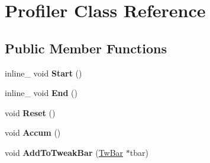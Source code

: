 \hypertarget{class_profiler}{\section{Profiler Class Reference}
\label{class_profiler}
}
\subsection*{Public Member Functions}
\begin{DoxyCompactItemize}
\item 
\hypertarget{class_profiler_a81f783a709b4047f2286f90353089a0e}{inline\+\_\+ void {\bfseries Start} ()}\label{class_profiler_a81f783a709b4047f2286f90353089a0e}

\item 
\hypertarget{class_profiler_a1f6cfd5cc21957b94df590169c118d4b}{inline\+\_\+ void {\bfseries End} ()}\label{class_profiler_a1f6cfd5cc21957b94df590169c118d4b}

\item 
\hypertarget{class_profiler_a6045c5de1798fe90d0e56f8f655f56fe}{void {\bfseries Reset} ()}\label{class_profiler_a6045c5de1798fe90d0e56f8f655f56fe}

\item 
\hypertarget{class_profiler_aa4016c36841b61a336d6e61a4e94e4ec}{void {\bfseries Accum} ()}\label{class_profiler_aa4016c36841b61a336d6e61a4e94e4ec}

\item 
\hypertarget{class_profiler_a7e9219df5153abe77e94d7f469ecc73e}{void {\bfseries Add\+To\+Tweak\+Bar} (\hyperlink{struct_c_tw_bar}{Tw\+Bar} $\ast$tbar)}\label{class_profiler_a7e9219df5153abe77e94d7f469ecc73e}

\end{DoxyCompactItemize}
